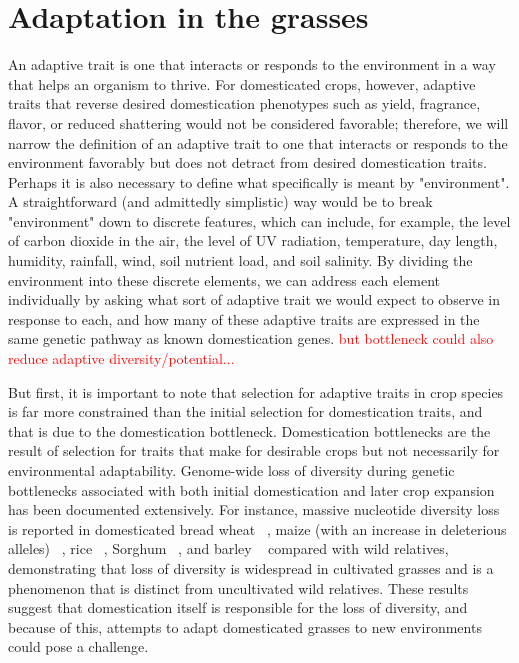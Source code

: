\documentclass[12pt]{article}
\newcommand{\mbh}[1]{\textcolor{red}{\normalsize  #1}}
\begin{document}
\section*{Adaptation in the grasses}
An adaptive trait is one that interacts or responds to the environment in a way that helps an organism to thrive.
For domesticated crops, however, adaptive traits that reverse desired domestication phenotypes such as yield, fragrance, flavor, or reduced shattering would not be considered favorable; therefore, we will narrow the definition of an adaptive trait to one that interacts or responds to the environment favorably but does not detract from desired domestication traits.
Perhaps it is also necessary to define what specifically is meant by "environment".
A straightforward (and admittedly simplistic) way would be to break "environment" down to discrete features, which can include, for example, the level of carbon dioxide in the air, the level of UV radiation, temperature, day length, humidity, rainfall, wind, soil nutrient load, and soil salinity.
By dividing the environment into these discrete elements, we can address each element individually by asking what sort of adaptive trait we would expect to observe in response to each, and how many of these adaptive traits are expressed in the same genetic pathway as known domestication genes. \mbh{but bottleneck could also reduce adaptive diversity/potential...}

But first, it is important to note that selection for adaptive traits in crop species is far more constrained than the initial selection for domestication traits, and that is due to the domestication bottleneck.
Domestication bottlenecks are the result of selection for traits that make for desirable crops but not necessarily for environmental adaptability.
Genome-wide loss of diversity during genetic bottlenecks associated with both initial domestication and later crop expansion has been documented extensively. \cite{Wang2017}
For instance, massive nucleotide diversity loss is reported in domesticated bread wheat ~\citep{Haudry2007}, maize (with an increase in deleterious alleles) ~\citep{pmid9539756, Wang2017}, rice ~\citep{pmid17218640}, Sorghum ~\citep{Hamblin2006}, and barley ~\citep{Kilian2006} compared with wild relatives, demonstrating that loss of diversity is widespread in cultivated grasses and is a phenomenon that is distinct from uncultivated wild relatives.
These results suggest that domestication itself is responsible for the loss of diversity, and because of this, attempts to adapt domesticated grasses to new environments could pose a challenge.  
\end{document}
